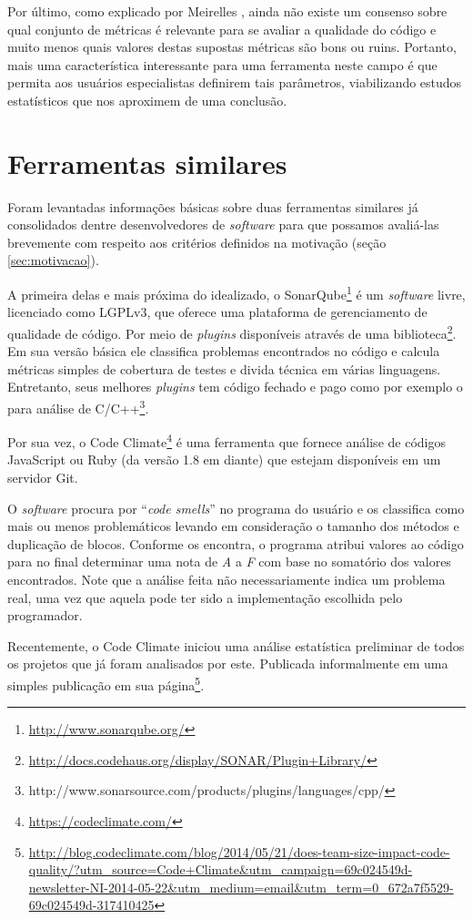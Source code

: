 \documentclass[12pt]{article}
\begin{document}
Por último, como explicado por Meirelles \cite{m13}, ainda não existe um consenso sobre qual conjunto de métricas é relevante para se avaliar a qualidade do código e muito menos quais valores destas supostas métricas são bons ou ruins. Portanto, mais uma característica interessante para uma ferramenta neste campo é que permita aos usuários especialistas definirem tais parâmetros, viabilizando estudos estatísticos que nos aproximem de uma conclusão.

\section{Ferramentas similares}
Foram levantadas informações básicas sobre duas ferramentas similares já consolidados dentre desenvolvedores de \textit{software} para que possamos avaliá-las brevemente com respeito aos critérios definidos na motivação (seção \ref{sec:motivacao}).

A primeira delas e mais próxima do idealizado, o SonarQube\footnote{\url{http://www.sonarqube.org/}} é um \textit{software} livre, licenciado como LGPLv3, que oferece uma plataforma de gerenciamento de qualidade de código. Por meio de \textit{plugins} disponíveis através de uma biblioteca\footnote{\url{http://docs.codehaus.org/display/SONAR/Plugin+Library/}}. Em sua versão básica ele classifica problemas encontrados no código e calcula métricas simples de cobertura de testes e divida técnica em várias linguagens. Entretanto, seus melhores \textit{plugins} tem código fechado e pago como por exemplo o para análise de C/C++\footnote{http://www.sonarsource.com/products/plugins/languages/cpp/}.

Por sua vez, o Code Climate\footnote{\url{https://codeclimate.com/}} é uma ferramenta que fornece análise de códigos JavaScript ou Ruby (da versão 1.8 em diante) que estejam disponíveis em um servidor Git.

O \textit{software} procura por ``\textit{code smells}'' no programa do usuário e os classifica como mais ou menos problemáticos levando em consideração o tamanho dos métodos e duplicação de blocos. Conforme os encontra, o programa atribui valores ao código para no final determinar uma nota de \textit{A} a \textit{F} com base no somatório dos valores encontrados. Note que a análise feita não necessariamente indica um problema real, uma vez que aquela pode ter sido a implementação escolhida pelo programador.

Recentemente, o Code Climate iniciou uma análise estatística preliminar de todos os projetos que já foram analisados por este. Publicada informalmente em uma simples publicação em sua página\footnote{\url{http://blog.codeclimate.com/blog/2014/05/21/does-team-size-impact-code-quality/?utm_source=Code+Climate&utm_campaign=69c024549d-newsletter-NI-2014-05-22&utm_medium=email&utm_term=0_672a7f5529-69c024549d-317410425}}.
\end{document}
